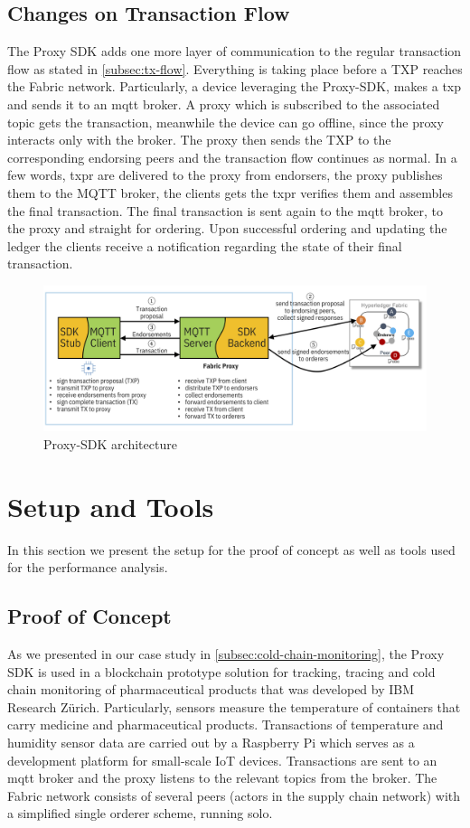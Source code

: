 \subsection{Changes on Transaction Flow}
The Proxy SDK adds one more layer of communication to the regular transaction flow as stated in \autoref{subsec:tx-flow}. Everything is taking place before a TXP reaches the Fabric network. Particularly, a device leveraging the Proxy-SDK, makes a \acrshort{txp} and sends it to an \acrshort{mqtt} broker. A proxy which is subscribed to the associated topic gets the transaction, meanwhile the device can go offline, since the proxy interacts only with the broker. The proxy then sends the TXP to the corresponding endorsing peers and the transaction flow continues as normal. In a few words, \acrshort{txpr} are delivered to the proxy from endorsers, the proxy publishes them to the MQTT broker, the clients gets the \acrshort{txpr} verifies them and assembles the final transaction. The final transaction is sent again to the \acrshort{mqtt} broker, to the proxy and straight for ordering. Upon successful ordering and updating the ledger the clients receive a notification regarding the state of their final transaction.
\begin{figure}
    \centering
    \includegraphics[width=1\textwidth]{images/6_performance/FabricSDKProxy_IBM.png}
    \caption{Proxy-SDK architecture \cite{proxy-sdk}}
    \label{fig:proxy-sdk}
\end{figure}
\section{Setup and Tools}
In this section we present the setup for the proof of concept as well as tools used for the performance analysis. 
\subsection{Proof of Concept}
As we presented in our case study in \ref{subsec:cold-chain-monitoring},
the Proxy SDK is used in a blockchain prototype solution for tracking, tracing and cold chain monitoring of pharmaceutical products that was developed by IBM Research Zürich. Particularly, sensors measure the temperature of containers that carry medicine and pharmaceutical products. Transactions of temperature and humidity sensor data are carried out by a Raspberry Pi which serves as a development platform for small-scale IoT devices. Transactions are sent to an \acrshort{mqtt} broker and the proxy listens to the relevant topics from the broker. The Fabric network consists of several peers (actors in the supply chain network) with a simplified single orderer scheme, running solo. 

